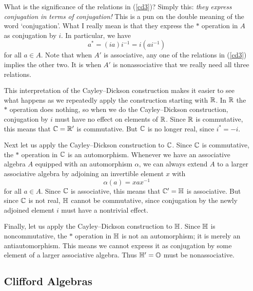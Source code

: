 What is the significance of the relations in (\ref{cd3})?   Simply   
this: {\sl they express conjugation in terms of conjugation!}  This is a pun   
on the double meaning of the word `conjugation'.  What I really mean is   
that they express the $\ast$ operation in $A$ as conjugation by $i$.  In   
particular, we have   
\[       a^\ast = (ia)i^{-1} = i(ai^{-1})   \]   
for all $a \in A$.  Note that when $A'$ is associative, any one of the   
relations in (\ref{cd3}) implies the other two.  It is when $A'$ is   
nonassociative that we really need all three relations.   

This interpretation of the Cayley--Dickson construction makes it easier   
to see what happens as we repeatedly apply the construction starting with   
${\mathbb R}$.  In ${\mathbb R}$ the $\ast$ operation does nothing, so when we do the   
Cayley--Dickson construction, conjugation by $i$ must have no effect on   
elements of ${\mathbb R}$.  Since ${\mathbb R}$ is commutative, this means that ${\mathbb C} = {\mathbb R}'$   
is commutative.  But ${\mathbb C}$ is no longer real, since $i^* = -i$.   
   
Next let us apply the Cayley--Dickson construction to ${\mathbb C}$.  Since ${\mathbb C}$   
is commutative, the $\ast$ operation in ${\mathbb C}$ is an automorphism.  Whenever   
we have an associative algebra $A$ equipped with an automorphism $\alpha$,    
we can always extend $A$ to a larger associative algebra by adjoining an    
invertible element $x$ with    
\[                \alpha(a) = xax^{-1}  \]    
for all $a \in A$.  Since ${\mathbb C}$ is associative, this means that ${\mathbb C}' =   
{\mathbb H}$ is associative.  But since ${\mathbb C}$ is not real, ${\mathbb H}$ cannot be   
commutative, since conjugation by the newly adjoined element $i$ must   
have a nontrivial effect.   
   
Finally, let us apply the Cayley--Dickson construction to ${\mathbb H}$.   Since   
${\mathbb H}$ is noncommutative, the $\ast$ operation in ${\mathbb H}$ is not an   
automorphism; it is merely an antiautomorphism.   This means we cannot   
express it as conjugation by some element of a larger associative   
algebra.  Thus ${\mathbb H}' = {\mathbb O}$ must be nonassociative.     

\subsection{Clifford Algebras} \label{clifford}      

